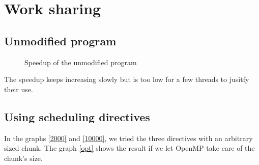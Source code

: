 \chapter{Work sharing}

\section{Unmodified program}

\begin{figure}[!h]
  \begin{center}
  \end{center}
  \caption{Speedup of the unmodified program}
  \label{unmodif}
\end{figure}

The speedup keeps increasing slowly but is too low for a few threads to jusitfy their use.

\section{Using scheduling directives}

In the graphs \ref{2000} and \ref{10000}, we tried the three directives with an arbitrary sized chunk. The graph \ref{opt} shows the result if we let OpenMP take care of the chunk's size.

